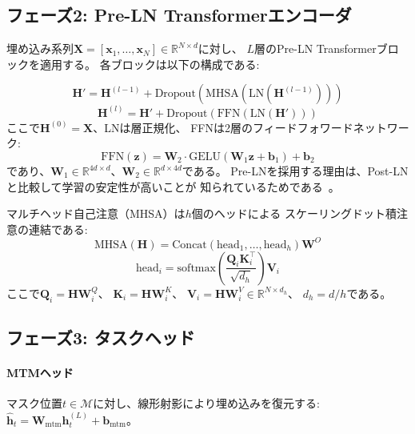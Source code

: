 \documentclass[sigconf,nonacm]{acmart}
\begin{document}
\subsection{フェーズ2: Pre-LN Transformerエンコーダ}

埋め込み系列$\mathbf{X} = [\mathbf{x}_1, \ldots, \mathbf{x}_N] \in \mathbb{R}^{N \times d}$に対し、
$L$層のPre-LN Transformerブロックを適用する。
各ブロックは以下の構成である:

\begin{equation}
    \mathbf{H}' = \mathbf{H}^{(l-1)} + \text{Dropout}\left(\text{MHSA}\left(\text{LN}(\mathbf{H}^{(l-1)})\right)\right)
\end{equation}
\begin{equation}
    \mathbf{H}^{(l)} = \mathbf{H}' + \text{Dropout}\left(\text{FFN}\left(\text{LN}(\mathbf{H}')\right)\right)
\end{equation}
ここで$\mathbf{H}^{(0)} = \mathbf{X}$、LNは層正規化、
FFNは2層のフィードフォワードネットワーク:
\begin{equation}
    \text{FFN}(\mathbf{z}) = \mathbf{W}_2 \cdot \text{GELU}(\mathbf{W}_1 \mathbf{z} + \mathbf{b}_1) + \mathbf{b}_2
\end{equation}
であり、$\mathbf{W}_1 \in \mathbb{R}^{4d \times d}$、$\mathbf{W}_2 \in \mathbb{R}^{d \times 4d}$である。
Pre-LNを採用する理由は、Post-LNと比較して学習の安定性が高いことが
知られているためである~\cite{xiong2020layer}。

マルチヘッド自己注意（MHSA）は$h$個のヘッドによる
スケーリングドット積注意の連結である:
\begin{equation}
    \text{MHSA}(\mathbf{H}) = \text{Concat}(\text{head}_1, \ldots, \text{head}_h) \mathbf{W}^O
\end{equation}
\begin{equation}
    \text{head}_i = \text{softmax}\left(\frac{\mathbf{Q}_i \mathbf{K}_i^\top}{\sqrt{d_h}}\right) \mathbf{V}_i
\end{equation}
ここで$\mathbf{Q}_i = \mathbf{H}\mathbf{W}_i^Q$、
$\mathbf{K}_i = \mathbf{H}\mathbf{W}_i^K$、
$\mathbf{V}_i = \mathbf{H}\mathbf{W}_i^V \in \mathbb{R}^{N \times d_h}$、
$d_h = d/h$である。

\subsection{フェーズ3: タスクヘッド}

\paragraph{MTMヘッド}
マスク位置$t \in \mathcal{M}$に対し、線形射影により埋め込みを復元する:
$\hat{\mathbf{h}}_t = \mathbf{W}_{\text{mtm}} \mathbf{h}_t^{(L)} + \mathbf{b}_{\text{mtm}}$。
\end{document}
